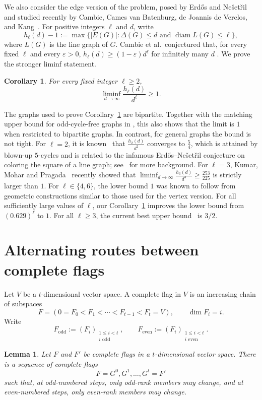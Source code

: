 \documentclass[11pt]{article}
\theoremstyle{plain}
\newtheorem{lemma}[theorem]{Lemma}
\newtheorem{corollary}[theorem]{Corollary}
\theoremstyle{definition}
\DeclareMathOperator{\diam}{diam}
\begin{document}
We also consider the edge version of the problem, posed by Erd\H{o}s and Ne\v{s}et\v{r}il~\cite{Erdos88} and studied recently by Cambie, Cames van Batenburg, de Joannis de Verclos, and Kang~\cite{CCJK}.  For positive integers $\ell$ and $d$, write
\begin{equation}\label{eq:hell}
  h_\ell(d)-1:=\max\{|E(G)|:\Delta(G)\le d
  \text{ and }\diam L(G)\le\ell\},
\end{equation}
where $L(G)$ is the line graph of $G$.  Cambie et al.\ conjectured that, for every fixed $\ell$ and every $\varepsilon>0$, $h_\ell(d)\ge(1-\varepsilon)d^\ell$ for infinitely many $d$
\cite[Conjecture~3]{CCJK}.  We prove the stronger liminf statement.

\begin{corollary}\label{cor:edge}
For every fixed integer $\ell\ge2$,
\begin{equation}\label{eq:edge-limit}
  \liminf_{d\to\infty}\frac{h_\ell(d)}{d^\ell}\ge1.
\end{equation}
\end{corollary}

The graphs used to prove Corollary~\ref{cor:edge} are bipartite.  Together with the matching upper bound for odd-cycle-free graphs in
\cite[Theorem~7]{CCJK}, this also shows that the limit is $1$ when restricted to bipartite graphs.
In contrast, for general graphs the bound is not tight. For $\ell=2$, it is known~\cite{CGTT90} that $\frac{h_2(d)}{d^2}$ converges to $\frac{5}{4}$, which is attained by blown-up $5$-cycles and is related to the infamous Erd\H{o}s--Ne\v{s}et\v{r}il conjecture on coloring the square of a line graph; see~\cite{Cranston26, CvBKP20, DHJKV26} for more background. For $\ell=3$, Kumar, Mohar and Pragada~\cite{KMP26} recently showed that $\liminf_{d\to\infty}\frac{h_3(d)}{d^3}\ge \frac{253}{225}$ is strictly larger than $1$. For $\ell \in\{4,6\}$, the lower bound $1$ was known to follow from geometric constructions similar to those used for the vertex version. For all sufficiently large values of $\ell$, our Corollary~\ref{cor:edge} improves the lower bound from $ (0.629)^{\ell}$ to $1$. For all $\ell\ge 3$, the current best upper bound~\cite{CCJK} is $3/2$.

\section{Alternating routes between complete flags}

Let $V$ be a $t$-dimensional vector space.  A complete flag in $V$ is an increasing chain of subspaces
$$F=(0=F_0<F_1<\cdots<F_{t-1}<F_t=V),\qquad \dim F_i=i.$$
Write
$$F_{\mathrm{odd}}
  :=(F_i)_{\substack{1\le i<t\\ i\text{ odd}}}, \qquad F_{\mathrm{even}}
  :=(F_i)_{\substack{1\le i<t\\ i\text{ even}}}.$$
\begin{lemma}\label{lem:routing}
Let $F$ and $F'$ be complete flags in a $t$-dimensional vector space.  There is a sequence of complete flags
$$F=G^0,G^1,\ldots,G^t=F'$$
such that, at odd-numbered steps, only odd-rank members may change, and at even-numbered steps, only even-rank members may change.
\end{lemma}
\end{document}
